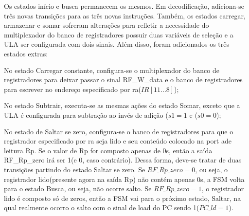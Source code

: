 \documentclass{article}
\begin{document}
Os estados início e busca permanecem os mesmos. Em decodificação, adiciona-se três novas transições para as três novas instruções. Também, os estados carregar, armazenar e somar sofreram alterações para refletir a necessidade do multiplexador do banco de registradores possuir duas variáveis de seleção e a ULA ser configurada com dois sinais. Além disso, foram adicionados os três estados extras:

\begin{boxlabel}
     \item No estado Carregar constante, configura-se o multiplexador do banco de registradores para deixar passar o sinal RF\_W\_data e o banco de registradores para escrever no endereço especificado por ra($IR[11...8]$);
     \item No estado Subtrair, executa-se as mesmas ações do estado Somar, exceto que a ULA é configurada para subtração ao invés de adição ($s1=1 $ e ($s0=0$);
     \item No estado de Saltar se zero, configura-se o banco de registradores para que o registrador especificado por ra seja lido e seu conteúdo colocado na port ade leitura Rp. Se o valor de Rp for composto apenas de 0s, então a saída RF\_Rp\_zero irá ser 1(e 0, caso contrário). Dessa forma, deve-se tratar de duas transições partindo do estado Saltar se zero. Se $RF\_Rp\_zero=0$, ou seja, o registrador lido(presente agora na saída Rp) não contém apenas 0s, a FSM volta para o estado Busca, ou seja, não ocorre salto. Se $RF\_Rp\_zero=1$, o registrador lido é composto só de zeros, então a FSM vai para o próximo estado, Saltar, na qual realmente ocorro o salto com o sinal de load do PC sendo 1($PC\_ld=1$).
\end{boxlabel}

\newpage
 
\end{document}
